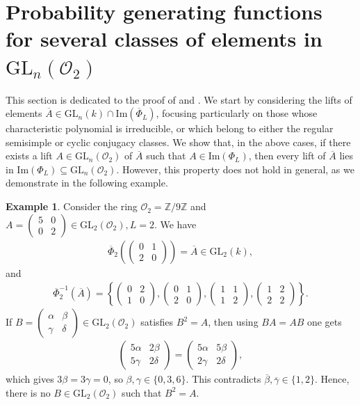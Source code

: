 \documentclass[11pt,twoside]{amsart}
\newcommand{\GL}{\mathrm{GL}}
\newcommand{\im}{\mathrm{Im}}
\newcommand{\Z}{\mathbb{Z}}
\newcommand{\R}{\mathscr{O}_2}
\theoremstyle{definition} %
\newtheorem{example}[lemma]{Example}
\begin{document}
\section{Probability generating functions for several classes of elements in $\GL_n(\R)$}\label{sec:counting}
This section is dedicated to the proof of  and . 
We start by considering the lifts of elements $\overline{A} \in \GL_n(k) \cap \im(\overline{\Phi}_L)$, focusing particularly on those whose characteristic polynomial is irreducible, or which belong to either the regular semisimple or cyclic conjugacy classes.
We show that, in the above cases, if there exists a lift $A \in \GL_n(\R)$ of $\overline{A}$ such that $A \in \im(\Phi_L)$, then every lift of $\overline{A}$ lies in $\im(\Phi_L) \subseteq \GL_n(\R)$.
However, this property does not hold in general, as we demonstrate in the following example.
\begin{example}\label{exm:down-not-up}
Consider the ring $\R=\Z/9\Z$ and 
$
A=\begin{pmatrix}5&0\\0&2\end{pmatrix}\in\GL_2(\R), L=2.
$
We have 
\begin{align*}
\overline{\Phi}_2\!\left(\begin{pmatrix}0&1\\2&0\end{pmatrix}\right)=\overline{A}\in\GL_2(k),
\end{align*}
and
\begin{align*}
\overline{\Phi}_2^{-1}(\overline{A})
=\left\{
\begin{pmatrix}0&2\\1&0\end{pmatrix},
\begin{pmatrix}0&1\\2&0\end{pmatrix},
\begin{pmatrix}1&1\\1&2\end{pmatrix},
\begin{pmatrix}1&2\\2&2\end{pmatrix}
\right\}.
\end{align*}
If $B=\begin{pmatrix}\alpha&\beta\\\gamma&\delta\end{pmatrix}\in\GL_2(\R)$ satisfies $B^2=A$, then using $BA=AB$ one gets
\begin{align*}
\begin{pmatrix}5\alpha&2\beta\\5\gamma&2\delta\end{pmatrix}
=\begin{pmatrix}5\alpha&5\beta\\2\gamma&2\delta\end{pmatrix},
\end{align*}
which gives $3\beta=3\gamma=0$, so $\beta,\gamma\in\{0,3,6\}$.  
This contradicts $\overline{\beta},\overline{\gamma}\in\{1,2\}$.  
Hence, there is no $B\in\GL_2(\R)$ such that $B^2=A$.
\end{example}
\end{document}

